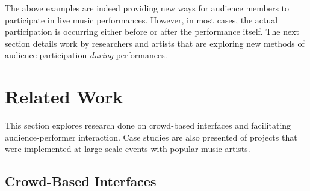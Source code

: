 
The above examples are indeed providing new ways for audience members to participate in live music performances. However, in most cases, the actual participation is occurring either before or after the performance itself. The next section details work by researchers and artists that are exploring new methods of audience participation \textit{during} performances.


\section{Related Work}

This section explores research done on crowd-based interfaces and facilitating audience-performer interaction. Case studies are also presented of projects that were implemented at large-scale events with popular music artists.

\subsection{Crowd-Based Interfaces}


